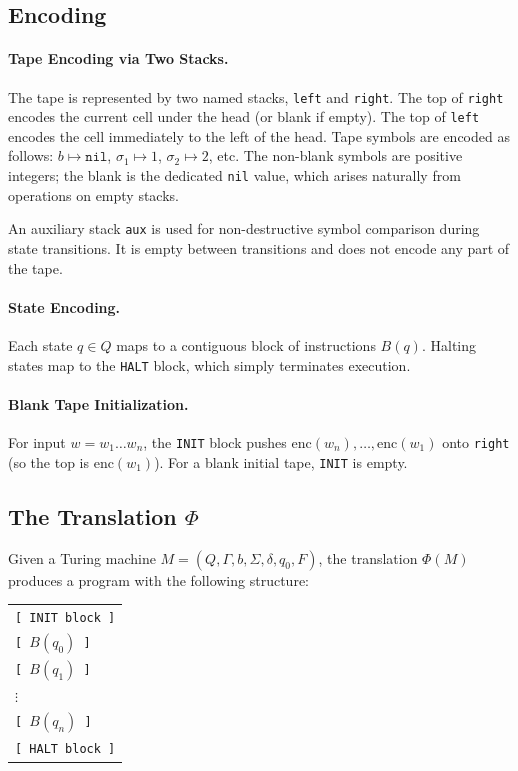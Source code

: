 \subsection{Encoding}
\label{sec:results:turing:encoding}

\paragraph{Tape Encoding via Two Stacks.}
The tape is represented by two named stacks, \texttt{left} and \texttt{right}. The top of \texttt{right} encodes the current cell under the head (or blank if empty). The top of \texttt{left} encodes the cell immediately to the left of the head. Tape symbols are encoded as follows: $b \mapsto \texttt{nil}$, $\sigma_1 \mapsto 1$, $\sigma_2 \mapsto 2$, etc. The non-blank symbols are positive integers; the blank is the dedicated \texttt{nil} value, which arises naturally from operations on empty stacks.

An auxiliary stack \texttt{aux} is used for non-destructive symbol comparison during state transitions. It is empty between transitions and does not encode any part of the tape.

\paragraph{State Encoding.}
Each state $q \in Q$ maps to a contiguous block of instructions $B(q)$. Halting states map to the \texttt{HALT} block, which simply terminates execution.

\paragraph{Blank Tape Initialization.}
For input $w = w_1 \dots w_n$, the \texttt{INIT} block pushes $\mathrm{enc}(w_n), \dots, \mathrm{enc}(w_1)$ onto \texttt{right} (so the top is $\mathrm{enc}(w_1)$). For a blank initial tape, \texttt{INIT} is empty.

\subsection{The Translation $\Phi$}
\label{sec:results:turing:translation}

Given a Turing machine $M = (Q, \Gamma, b, \Sigma, \delta, q_0, F)$, the translation $\Phi(M)$ produces a \sculpt program with the following structure:

\begin{center}
\begin{tabular}{l}
\texttt{[ INIT block ]} \\
\texttt{[ $B(q_0)$ ]} \\
\texttt{[ $B(q_1)$ ]} \\
\quad $\vdots$ \\
\texttt{[ $B(q_n)$ ]} \\
\texttt{[ HALT block ]}
\end{tabular}
\end{center}


